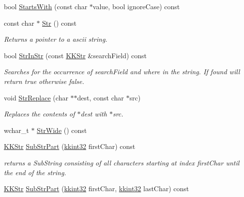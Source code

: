 \begin{DoxyCompactItemize}
\item 
bool \hyperlink{class_k_k_b_1_1_k_k_str_a0762ebfb0ff42489c1717d1eb3301080}{Starts\+With} (const char $\ast$value, bool ignore\+Case) const 
\item 
const char $\ast$ \hyperlink{class_k_k_b_1_1_k_k_str_ad574e6c0fe7f6ce1ba3ab0a8ce2fbd52}{Str} () const 
\begin{DoxyCompactList}\small\item\em Returns a pointer to a ascii string. \end{DoxyCompactList}\item 
bool \hyperlink{class_k_k_b_1_1_k_k_str_acaceb60beca1b06294472967009feb7f}{Str\+In\+Str} (const \hyperlink{class_k_k_b_1_1_k_k_str}{K\+K\+Str} \&search\+Field) const 
\begin{DoxyCompactList}\small\item\em Searches for the occurrence of \textquotesingle{}search\+Field\textquotesingle{} and where in the string. If found will return \textquotesingle{}true\textquotesingle{} otherwise \textquotesingle{}false\textquotesingle{}. \end{DoxyCompactList}\item 
void \hyperlink{class_k_k_b_1_1_k_k_str_ac16bd43d02166defd98e86beecbbc287}{Str\+Replace} (char $\ast$$\ast$dest, const char $\ast$src)
\begin{DoxyCompactList}\small\item\em Replaces the contents of $\ast$dest with $\ast$src. \end{DoxyCompactList}\item 
wchar\+\_\+t $\ast$ \hyperlink{class_k_k_b_1_1_k_k_str_ae6f19036851c09ddb022185aaa2ba183}{Str\+Wide} () const 
\item 
\hyperlink{class_k_k_b_1_1_k_k_str}{K\+K\+Str} \hyperlink{class_k_k_b_1_1_k_k_str_a5f20b2ddfc9f07c8ef99592810332ddb}{Sub\+Str\+Part} (\hyperlink{namespace_k_k_b_a8fa4952cc84fda1de4bec1fbdd8d5b1b}{kkint32} first\+Char) const 
\begin{DoxyCompactList}\small\item\em returns a Sub\+String consisting of all characters starting at index \textquotesingle{}first\+Char\textquotesingle{} until the end of the string. \end{DoxyCompactList}\item 
\hyperlink{class_k_k_b_1_1_k_k_str}{K\+K\+Str} \hyperlink{class_k_k_b_1_1_k_k_str_a4eedec3674f18fddca3e79e3012af339}{Sub\+Str\+Part} (\hyperlink{namespace_k_k_b_a8fa4952cc84fda1de4bec1fbdd8d5b1b}{kkint32} first\+Char, \hyperlink{namespace_k_k_b_a8fa4952cc84fda1de4bec1fbdd8d5b1b}{kkint32} last\+Char) const 
$$
\end{DoxyCompactItemize}
